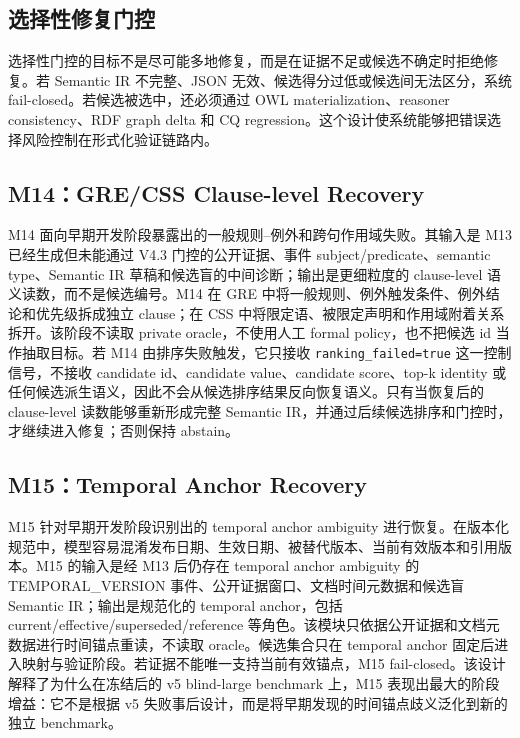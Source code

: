 \documentclass[11pt]{article}
\begin{document}
\subsection{选择性修复门控}

选择性门控的目标不是尽可能多地修复，而是在证据不足或候选不确定时拒绝修复。若 Semantic IR 不完整、JSON 无效、候选得分过低或候选间无法区分，系统 fail-closed。若候选被选中，还必须通过 OWL materialization、reasoner consistency、RDF graph delta 和 CQ regression。这个设计使系统能够把错误选择风险控制在形式化验证链路内。

\subsection{M14：GRE/CSS Clause-level Recovery}

M14 面向早期开发阶段暴露出的一般规则--例外和跨句作用域失败。其输入是 M13 已经生成但未能通过 V4.3 门控的公开证据、事件 subject/predicate、semantic type、Semantic IR 草稿和候选盲的中间诊断；输出是更细粒度的 clause-level 语义读数，而不是候选编号。M14 在 GRE 中将一般规则、例外触发条件、例外结论和优先级拆成独立 clause；在 CSS 中将限定语、被限定声明和作用域附着关系拆开。该阶段不读取 private oracle，不使用人工 formal policy，也不把候选 id 当作抽取目标。若 M14 由排序失败触发，它只接收 \texttt{ranking\_failed=true} 这一控制信号，不接收 candidate id、candidate value、candidate score、top-k identity 或任何候选派生语义，因此不会从候选排序结果反向恢复语义。只有当恢复后的 clause-level 读数能够重新形成完整 Semantic IR，并通过后续候选排序和门控时，才继续进入修复；否则保持 abstain。

\subsection{M15：Temporal Anchor Recovery}

M15 针对早期开发阶段识别出的 temporal anchor ambiguity 进行恢复。在版本化规范中，模型容易混淆发布日期、生效日期、被替代版本、当前有效版本和引用版本。M15 的输入是经 M13 后仍存在 temporal anchor ambiguity 的 TEMPORAL\_VERSION 事件、公开证据窗口、文档时间元数据和候选盲 Semantic IR；输出是规范化的 temporal anchor，包括 current/effective/superseded/reference 等角色。该模块只依据公开证据和文档元数据进行时间锚点重读，不读取 oracle。候选集合只在 temporal anchor 固定后进入映射与验证阶段。若证据不能唯一支持当前有效锚点，M15 fail-closed。该设计解释了为什么在冻结后的 v5 blind-large benchmark 上，M15 表现出最大的阶段增益：它不是根据 v5 失败事后设计，而是将早期发现的时间锚点歧义泛化到新的独立 benchmark。
\end{document}
